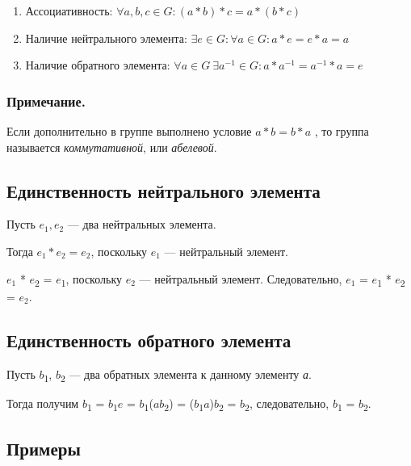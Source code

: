 \documentclass[12pt]{article}
\begin{document}
\begin{enumerate}
    \item
          Ассоциативность: $\forall a, b, c \in G: (a * b) * c = a * (b * c)$

    \item
          Наличие нейтрального элемента: $\exists e \in G : \forall a \in G: a * e = e * a = a$

    \item
          Наличие обратного элемента: $\forall a \in G \ \exists a^{−1}\in G: a * a^{−1} = a^{−1} * a = e$
\end{enumerate}

\subsubsection{Примечание.}

Если дополнительно в группе выполнено условие $a * b = b * a$ , то группа
называется \emph{коммутативной}, или \emph{абелевой}.

\subsection{Единственность нейтрального элемента}

Пусть $e_{1}, e_{2}$ --- два нейтральных элемента.

Тогда $e_{1} * e_{2} = e_{2}$, поскольку $e_{1}$ --- нейтральный элемент.

$e_{1}$ * $e$\textsubscript{2} = $e$\textsubscript{1}, поскольку
$e_{2}$ --- нейтральный элемент. Следовательно,
$e_{1}$ = $e$\textsubscript{1} * $e$\textsubscript{2} =
$e_{2}$.

\subsection{Единственность обратного
    элемента}

Пусть $b$\textsubscript{1}, $b$\textsubscript{2} --- два обратных элемента к
данному элементу \emph{а}.

Тогда получим $b$\textsubscript{1} = $b$\textsubscript{1}$e$ =
$b$\textsubscript{1}($a$$b$\textsubscript{2}) =
($b$\textsubscript{1}$a$)$b$\textsubscript{2} = $b$\textsubscript{2},
следовательно, $b$\textsubscript{1} = $b$\textsubscript{2}.

\subsection{Примеры}
\end{document}
